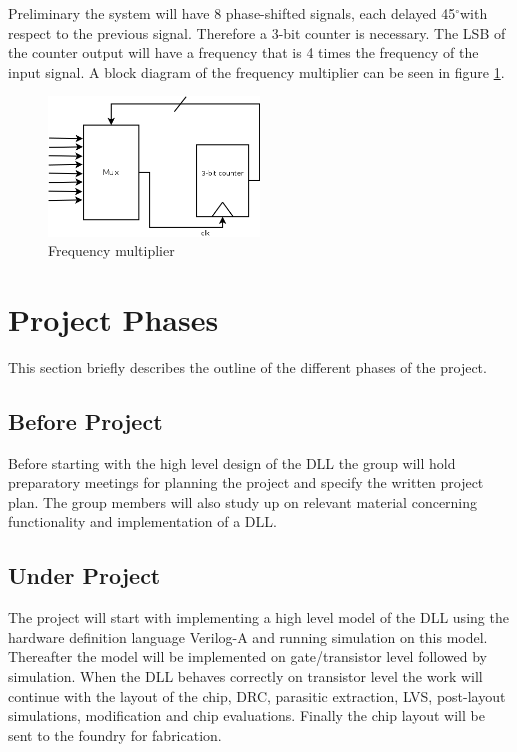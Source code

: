 \documentclass[a4paper,12pt]{article} \usepackage{graphicx}
\newcommand{\degree}{\ensuremath{^\circ}}
\begin{document}
Preliminary the system will have 8 phase-shifted signals, 
each delayed 45\degree with respect to the previous signal.
Therefore a 3-bit counter is necessary. The LSB of the counter output will 
have a frequency that is 4 times the frequency of the input signal.
A block diagram of the frequency multiplier can be seen in 
figure \ref{fig:freq_mult}.

\begin{figure}[h!]
        \centering
        \includegraphics[width=0.5\textwidth]{../Bilder/freq_mult.png}
        \caption{Frequency multiplier}
        \label{fig:freq_mult}
\end{figure}

\section{Project Phases} 
This section briefly describes the outline of the different phases of the
project.
\subsection{Before Project}
Before starting with the high level design of the DLL the group will hold
preparatory meetings for planning the project and specify the written project
plan. The group members will also study up on relevant material concerning
functionality and implementation of a DLL.
  
\subsection{Under Project}
The project will start with implementing a high level model of the DLL using
the hardware definition language Verilog-A and running simulation on this
model. Thereafter the model will be implemented on gate/transistor level followed by
simulation. When the DLL behaves correctly on transistor level the work will
continue with the layout of the chip, DRC, parasitic extraction, LVS,
post-layout simulations, modification and chip evaluations. Finally the chip
layout will be sent to the foundry for fabrication.
\end{document}
